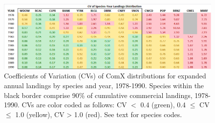 \documentclass[12pt]{article}
\begin{document}
%
\clearpage
%

\begin{landscape}
\begin{figure}
\centering
\vspace{-2cm}
\includegraphics[width=1.3\textwidth]{./pictures/CVs_by_species_and_year.png}
\caption{Coefficients of Variation (CVs) of ComX distributions for expanded 
annual landings by species and year, 1978-1990. Species within the black 
border comprise 90\% of cumulative commercial landings, 1978-1990. CVs are 
color coded as follows: CV $<$ 0.4 (green), 0.4 $\le$ CV $\le$ 1.0 (yellow), CV > 1.0  
(red). See text for species codes.} 
\label{Z}
\end{figure}
\end{landscape}

%
\clearpage 
\singlespacing
%
\end{document}
